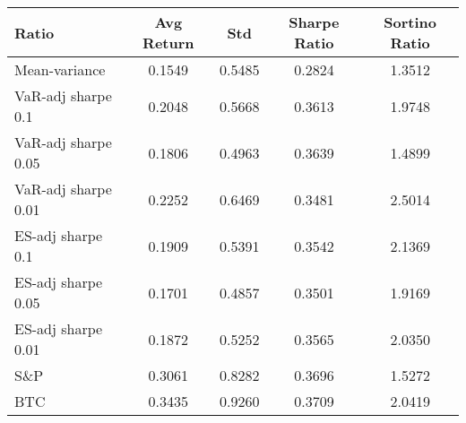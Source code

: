 \begin{tabular}{lcccc}
\toprule
Ratio & Avg Return & Std & Sharpe Ratio & Sortino Ratio\\
\midrule
Mean-variance & 0.1549 & 0.5485 & 0.2824 & 1.3512\\
VaR-adj sharpe 0.1 & 0.2048 & 0.5668 & 0.3613 & 1.9748\\
VaR-adj sharpe 0.05 & 0.1806 & 0.4963 & 0.3639 & 1.4899\\
VaR-adj sharpe 0.01 & 0.2252 & 0.6469 & 0.3481 & 2.5014\\
ES-adj sharpe 0.1 & 0.1909 & 0.5391 & 0.3542 & 2.1369\\
ES-adj sharpe 0.05 & 0.1701 & 0.4857 & 0.3501 & 1.9169\\
ES-adj sharpe 0.01 & 0.1872 & 0.5252 & 0.3565 & 2.0350\\
S\&P & 0.3061 & 0.8282 & 0.3696 & 1.5272\\
BTC & 0.3435 & 0.9260 & 0.3709 & 2.0419\\
\bottomrule
\end{tabular}
